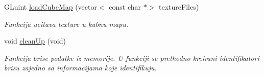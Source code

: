 \begin{DoxyCompactItemize}
G\+Luint \hyperlink{classcore_1_1VaoLoader_a98165161bee2940808fe5e546dfa25d9}{load\+Cube\+Map} (vector$<$ const char $\ast$$>$ texture\+Files)
\begin{DoxyCompactList}\small\item\em Funkcija ucitava texture u kubnu mapu. \end{DoxyCompactList}\item 
void \hyperlink{classcore_1_1VaoLoader_a15a5ec23ffe560ad7117980aaf0d97b9}{clean\+Up} (void)
\begin{DoxyCompactList}\small\item\em Funkcija brise podatke iz memorije. U funkciji se prethodno kreirani identifikatori brisu zajedno sa informacijama koje identifikuju. \end{DoxyCompactList}\end{DoxyCompactItemize}

